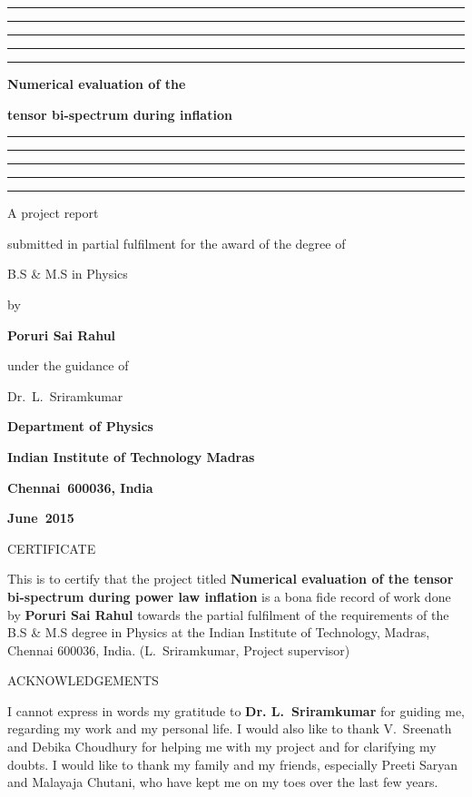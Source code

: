 \documentclass[12pt,a4paper,oneside]{book}
\begin{document}

\baselineskip 20pt




\thispagestyle{empty}
\topskip 15pt
\hrule\hrule\hrule\hrule\hrule
\vskip 20pt
\centerline{\Huge \bf Numerical evaluation of the} 
\vskip 15pt
\centerline{\Huge \bf tensor bi-spectrum during inflation}
\vskip 20pt
\hrule\hrule\hrule\hrule\hrule
\vskip 30pt
\centerline{\Large A project report}
\vskip 8pt
\centerline{\Large submitted in partial fulfilment 
for the award of the degree of}
\vskip 8pt
\centerline{\Large B.S \& M.S in Physics}
\vskip 8pt
\centerline{\Large by}
\vskip 8pt
\centerline{\Large \bf Poruri Sai Rahul}
\vskip 8pt
\centerline{\Large under the guidance of}
\vskip 8pt
\centerline{\Large  Dr.~L.~Sriramkumar}
\vskip 30pt 
\begin{center}
\end{center}
\vskip 8pt 
\centerline{\Large \bf Department of Physics}
\vskip 8pt 
\centerline{\Large \bf Indian Institute of Technology Madras}
\vskip 8pt 
\centerline{\Large \bf Chennai~600036, India}
\vskip 8pt
\centerline{\Large \bf June~2015}

\newpage\topskip 40pt
\centerline{\Large CERTIFICATE}
\thispagestyle{empty}
\vskip 20pt\noindent 
This is to certify that the project titled {\bf Numerical evaluation 
of the tensor bi-spectrum during power law inflation} is a bona fide 
record of work done by {\bf Poruri Sai Rahul} towards the partial fulfilment 
of the requirements of the B.S \& M.S degree in Physics at the Indian 
Institute of Technology, Madras, Chennai 600036, India.
\vskip 120pt
\hspace{240pt}(L.~Sriramkumar, Project supervisor)


\newpage\topskip 40pt
\thispagestyle{empty}
\centerline{\Large ACKNOWLEDGEMENTS}
\vskip 20pt\noindent 

I cannot express in words my gratitude to {\bf Dr. L.~Sriramkumar} for 
guiding me, regarding my work and my personal life. I would also like to 
thank V.~Sreenath and Debika Choudhury for helping me with my project 
and for clarifying my doubts. I would like to thank my family and my 
friends, especially Preeti Saryan and Malayaja Chutani, who have kept 
me on my toes over the last few years.
 
\end{document}
